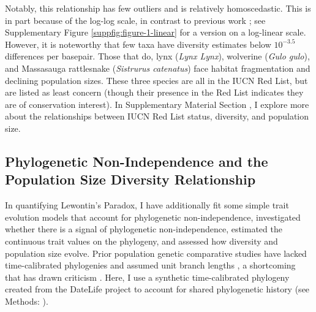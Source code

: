 \documentclass[11pt]{article}
\newcommand{\Newnameref}[1]{\textit{\nameref{#1}}}
\begin{document}
Notably, this relationship has few outliers and is relatively homoscedastic.
This is in part because of the log-log scale, in contrast to previous work
\parencite{Nei1984-zi,Soule1976-he}; see Supplementary Figure
\ref{suppfig:figure-1-linear} for a version on a log-linear scale. However, it
is noteworthy that few taxa have diversity estimates below $10^{-3.5}$
differences per basepair. Those that do, lynx (\emph{Lynx Lynx}), wolverine
(\emph{Gulo gulo}), and Massasauga rattlesnake (\emph{Sistrurus catenatus})
face habitat fragmentation and declining population sizes. These three species
are all in the IUCN Red List, but are listed as least concern (though their
presence in the Red List indicates they are of conservation interest). In
Supplementary Material Section \Newnameref{supinfo:div-iucn}, I explore more about
the relationships between IUCN Red List status, diversity, and population size.

\subsection*{Phylogenetic Non-Independence and the Population Size Diversity Relationship}

In quantifying Lewontin's Paradox, I have additionally fit some simple trait
evolution models that account for phylogenetic non-independence, investigated
whether there is a signal of phylogenetic non-independence, estimated the
continuous trait values on the phylogeny, and assessed how diversity and
population size evolve. Prior population genetic comparative studies have
lacked time-calibrated phylogenies and assumed unit branch lengths
\parencite{Whitney2010-ud}, a shortcoming that has drawn criticism
\parencite{Lynch2011-qv}. Here, I use a synthetic time-calibrated phylogeny
created from the DateLife project \parencite{OMeara2020-ds} to account for
shared phylogenetic history (see Methods: \Newnameref{sec:methods-pcm}).
\end{document}
